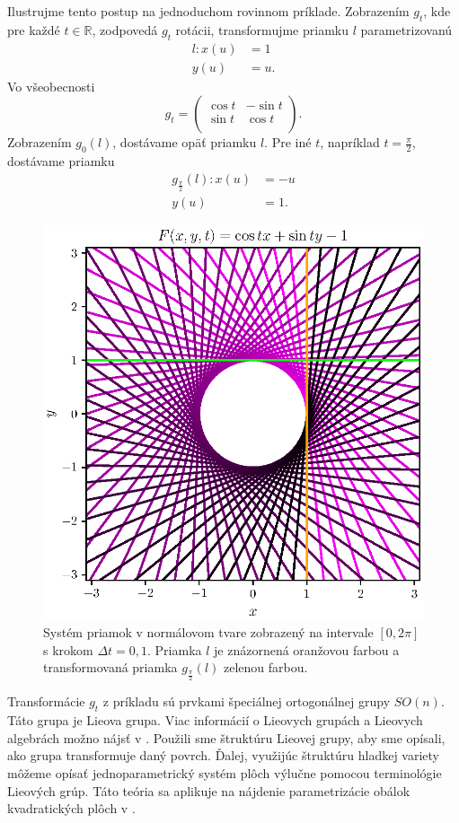 \begin{example}
Ilustrujme tento postup na jednoduchom rovinnom príklade. Zobrazením $g_t$, kde pre každé $t \in \mathbb{R}$, zodpovedá $g_t$ rotácii, transformujme priamku $l$  parametrizovanú
\begin{align*}
l \colon x(u) &= 1 \\
y(u) &= u. 
\end{align*}
Vo všeobecnosti 
$$
g_t = \begin{pmatrix}
\cos t & -\sin t  \\
\sin t & \cos t  \\
\end{pmatrix}.
$$
Zobrazením $g_{0}(l)$, dostávame opäť priamku $l$. Pre iné $t$, napríklad $t = \frac{\pi}{2}$, dostávame priamku 
\begin{align*}
g_{\frac{\pi}{2}}(l) \colon x(u) &= -u \\
y(u) &= 1.
\end{align*}
\begin{figure}[h]
	\centering
	\includegraphics{images/lines_in_normal_form.eps}
	\caption[Systém priamok v normálovom tvare.]{Systém priamok v normálovom tvare zobrazený na intervale $[0, 2\pi]$ s krokom $\Delta t = 0,1$. Priamka $l$ je znázornená oranžovou farbou a transformovaná priamka $g_{\frac{\pi}{2}}(l)$ zelenou farbou.}
	\label{fig:lines_in_normal_form}
\end{figure}
\end{example}
Transformácie $g_{t}$ z príkladu sú prvkami špeciálnej ortogonálnej grupy $SO(n)$. Táto grupa je Lieova grupa. Viac informácií o Lieovych grupách a Lieovych algebrách možno nájsť v \cite{Lee12}.
Použili sme štruktúru Lieovej grupy, aby sme opísali, ako grupa transformuje daný povrch. Ďalej, využijúc štruktúru hladkej variety môžeme opísať jednoparametrický systém plôch výlučne pomocou terminológie Lieových grúp. Táto teória sa aplikuje na nájdenie parametrizácie obálok kvadratických plôch v \cite{Vra22}. 

